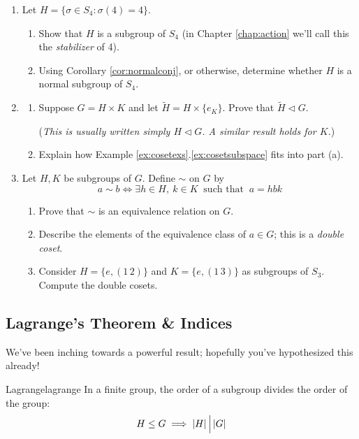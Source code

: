 \begin{exercises}{}{}
\begin{enumerate}
	
		\item Let $H=\{\sigma\in S_4:\sigma(4)=4\}$.
		\begin{enumerate}
		  \item Show that $H$ is a subgroup of $S_4$ (in Chapter \ref{chap:action} we'll call this the \emph{stabilizer} of 4).
		  \item Using Corollary \ref{cor:normalconj}, or otherwise, determine whether $H$ is a normal subgroup of $S_4$.
		\end{enumerate}
	  
	  
	  \item\label{exs:directprodfactor}\begin{enumerate}
	    \item Suppose $G=H\times K$ and let $\widetilde H=H\times\{e_K\}$. Prove that $\widetilde H\triangleleft G$.\par
	    (\emph{This is usually written simply $H\triangleleft G$. A similar result holds for $K$.})
	    \item Explain how Example \ref*{ex:cosetexs}.\ref{ex:cosetsubspace} fits into part (a).
	  \end{enumerate} 
	  
		
		\item Let $H,K$ be subgroups of $G$. Define $\sim$ on $G$ by
		\[
			a\sim b\iff \exists h\in H,\ k\in K \ \text{ such that }\ a=hb k
		\]
		\begin{enumerate}
	  	\item Prove that $\sim$ is an equivalence relation on $G$.
	  	\item Describe the elements of the equivalence class of $a\in G$; this is a \emph{double coset}.
	  	\item Consider $H=\{e,(1\,2)\}$ and $K=\{e,(1\,3)\}$ as subgroups of $S_3$. Compute the double cosets.
		\end{enumerate}
	\end{enumerate}
\end{exercises}


\clearpage


\subsection{Lagrange's Theorem \& Indices}\label{sec:lagrange}


We've been inching towards a powerful result; hopefully you've hypothesized this already!

\begin{thm}{Lagrange}{lagrange}
	In a finite group, the order of a subgroup divides the order of the group:\footnotemark
	\[
		H\le G\implies \left| H\right|\Big\vert \left| G\right|
	\]
\end{thm}

